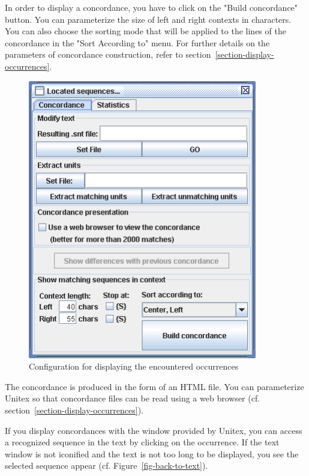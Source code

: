 \bigskip
{}
\noindent In order to display a concordance, you have to click on the "Build
concordance" button. You can parameterize the size of left and right contexts in characters.
You can also choose the sorting mode that will be applied to the lines of the
concordance in the "Sort According to" menu. For further details on the
parameters of concordance construction, refer to
section~\ref{section-display-occurrences}.
\begin{figure}[h]
\begin{center}
\includegraphics[width=10cm]{resources/img/fig6-31.png}
\caption{Configuration for displaying the encountered occurrences
\label{fig-configuration-display-occurrences}}
\end{center}
\end{figure}
\noindent The concordance is produced in the form of an HTML file.
 You can parameterize Unitex  so that concordance files 
can be read using a web browser
(cf. section~\ref{section-display-occurrences}).

\bigskip
\noindent If you display concordances with the window provided by Unitex,
you can access a recognized sequence in the text by clicking on the occurrence. If
the text window is not iconified and the text is not too long to be displayed,
you see the selected sequence appear (cf.
Figure~\ref{fig-back-to-text}).

